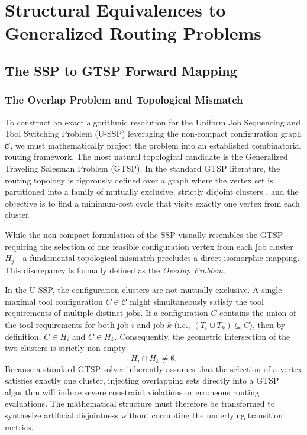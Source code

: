 \documentclass[11pt, a4paper]{book}
\begin{document}
	\chapter{Structural Equivalences to Generalized Routing Problems}
	
	\section{The SSP to GTSP Forward Mapping}
	
	\subsection{The Overlap Problem and Topological Mismatch}
	
	To construct an exact algorithmic resolution for the Uniform Job Sequencing and Tool Switching Problem (U-SSP) leveraging the non-compact configuration graph $\mathcal{C}$, we must mathematically project the problem into an established combinatorial routing framework. The most natural topological candidate is the Generalized Traveling Salesman Problem (GTSP). In the standard GTSP literature, the routing topology is rigorously defined over a graph where the vertex set is partitioned into a family of mutually exclusive, strictly disjoint clusters %
	, and the objective is to find a minimum-cost cycle that visits exactly one vertex from each cluster.
	
	While the non-compact formulation of the SSP visually resembles the GTSP—requiring the selection of one feasible configuration vertex from each job cluster $H_j$—a fundamental topological mismatch precludes a direct isomorphic mapping. This discrepancy is formally defined as the \textit{Overlap Problem}.
	
	In the U-SSP, the configuration clusters are not mutually exclusive. A single maximal tool configuration $C \in \mathcal{C}$ might simultaneously satisfy the tool requirements of multiple distinct jobs. If a configuration $C$ contains the union of the tool requirements for both job $i$ and job $k$ (i.e., $(T_i \cup T_k) \subseteq C$), then by definition, $C \in H_i$ and $C \in H_k$. Consequently, the geometric intersection of the two clusters is strictly non-empty:
	\begin{equation}
		H_i \cap H_k \neq \emptyset.
	\end{equation}
	Because a standard GTSP solver inherently assumes that the selection of a vertex satisfies exactly one cluster, injecting overlapping sets directly into a GTSP algorithm will induce severe constraint violations or erroneous routing evaluations. The mathematical structure must therefore be transformed to synthesize artificial disjointness without corrupting the underlying transition metrics.
	
\end{document}
